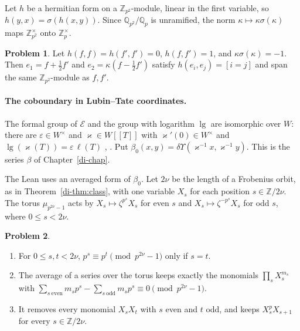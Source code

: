 \documentclass[reqno]{amsart}
\newcounter{chap}
\theoremstyle{definition}
\newtheorem{problem}{Problem}[section]
\theoremstyle{plain}
\theoremstyle{remark}
\newcommand{\Z}{\mathbb Z}
\newcommand{\Q}{\mathbb Q}
\newcommand{\Ec}{\mathcal E}
\renewcommand{\lg}{\operatorname{lg}}
\begin{document}
Let \(h\) be a hermitian form on a \(\Z_{p^2}\)-module, linear in the first variable, so \(h(y,x)=\sigma(h(x,y))\).  Since \(\Q_{p^2}/\Q_p\) is unramified, the norm \(\kappa\mapsto\kappa\sigma(\kappa)\) maps \(\Z_{p^2}^\times\) onto \(\Z_p^\times\).

\begin{problem}\label{pr:hypplane}
Let \(h(f,f)=h(f',f')=0\), \(h(f,f')=1\), and \(\kappa\sigma(\kappa)=-1\).  Then \(e_1=f+\frac12f'\) and \(e_2=\kappa(f-\frac12f')\) satisfy \(h(e_i,e_j)=[i=j]\) and span the same \(\Z_{p^2}\)-module as \(f,f'\).
\end{problem}

\paragraph{The coboundary in Lubin--Tate coordinates.}  The formal group of \(\Ec\) and the group with logarithm \(\lg\) are isomorphic over \(W\): there are \(\varepsilon\in W^\times\) and \(\varkappa\in W[[T]]\) with \(\varkappa'(0)\in W^\times\) and \(\lg(\varkappa(T))=\varepsilon\,\ell(T)\) \cite[Prop.~8.11]{Adr}, \cite{LT}.  Put \(\beta_0(x,y)=\delta\Upsilon(\varkappa^{-1}x,\varkappa^{-1}y)\).  This is the series \(\beta\) of Chapter~\ref{di-chap}.

The Lean uses an averaged form of \(\beta_0\).  Let \(2\nu\) be the length of a Frobenius orbit, as in Theorem~\ref{di-thm:class}, with one variable \(X_s\) for each position \(s\in\Z/2\nu\).  The torus \(\mu_{p^{2\nu}-1}\) acts by \(X_s\mapsto \zeta^{p^s}X_s\) for even \(s\) and \(X_s\mapsto \zeta^{-p^s}X_s\) for odd \(s\), where \(0\le s<2\nu\).

\begin{problem}\label{pr:torus}
\begin{enumerate}
\item[(i)] For \(0\le s,t<2\nu\), \(p^s\equiv p^t\pmod{p^{2\nu}-1}\) only if \(s=t\).
\item[(ii)] The average of a series over the torus keeps exactly the monomials \(\prod_sX_s^{m_s}\) with \(\sum_{s\ \mathrm{even}}m_sp^s-\sum_{s\ \mathrm{odd}}m_sp^s\equiv0\pmod{p^{2\nu}-1}\).
\item[(iii)] It removes every monomial \(X_sX_t\) with \(s\) even and \(t\) odd, and keeps \(X_s^pX_{s+1}\) for every \(s\in\Z/2\nu\).
\end{enumerate}
\end{problem}
\end{document}

